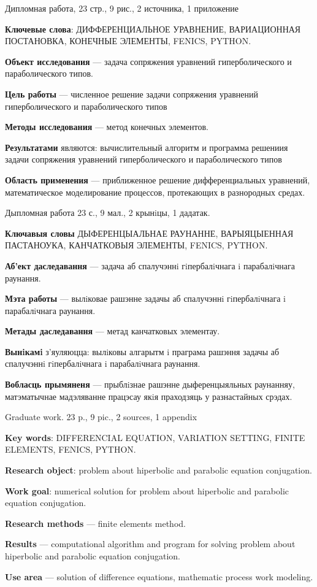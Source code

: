 \pagestyle{plain}
Дипломная работа, 23 стр., 9 рис., 2 источника, 1 приложение

\textbf{Ключевые слова}: ДИФФЕРЕНЦИАЛЬНОЕ УРАВНЕНИЕ, ВАРИАЦИОННАЯ ПОСТАНОВКА, 
КОНЕЧНЫЕ ЭЛЕМЕНТЫ, FENICS, PYTHON.

\textbf{Объект исследования} --- задача сопряжения уравнений гиперболического и параболического типов.

\textbf{Цель работы} --- численное решение задачи сопряжения уравнений гиперболического и параболического типов

\textbf{Методы исследования} --- метод конечных элементов.

\textbf{Результатами} являются: вычислительный алгоритм и программа решениия задачи сопряжения
уравнений гиперболического и параболического типов

\textbf{Область применения} --- приближенное решение дифференциальных уравнений, математическое
моделирование процессов, протекающих в разнородных средах.


Дыпломная работа 23 с., 9 мал., 2 крынiцы, 1 дадатак.

\textbf{Ключавыя словы} ДЫФЕРЕНЦЫАЛЬНАЕ РАУНАННЕ, ВАРЫЯЦЫЕННАЯ ПАСТАНОУКА, КАНЧАТКОВЫЯ ЭЛЕМЕНТЫ,
FENICS, PYTHON.

\textbf{Аб'ект даследавання} --- задача аб спалучэннi гiпербалiчнага i парабалiчнага раунання.

\textbf{Мэта работы} --- вылiковае рашэнне задачы аб спалучэннi гiпербалiчнага i парабалiчнага раунання.

\textbf{Метады даследавання} --- метад канчатковых элементау.

\textbf{Вынiкамi} з'яуляюцца: вылiковы алгарытм i праграма рашэння задачы аб спалучэннi гiпербалiчнага i парабалiчнага раунання.

\textbf{Вобласць прымяненя} --- прыблiзнае рашэнне дыференцыяльных раунанняу, матэматычнае
мадэляванне працэсау якiя праходзяць у разнастайных срэдах.

Graduate work. 23 p., 9 pic., 2 sources, 1 appendix

\textbf{Key words}: DIFFERENCIAL EQUATION, VARIATION SETTING, FINITE ELEMENTS, FENICS, PYTHON.

\textbf{Research object}: problem about hiperbolic and parabolic equation conjugation.

\textbf{Work goal}: numerical solution for problem about hiperbolic and parabolic equation conjugation.

\textbf{Research methods} --- finite elements method.

\textbf{Results} --- computational algorithm and program for solving problem about hiperbolic
and parabolic equation conjugation.

\textbf{Use area} --- solution of difference equations, mathematic process work modeling.
